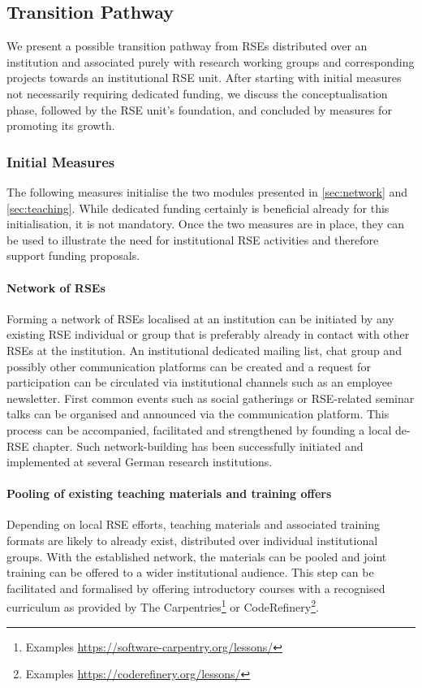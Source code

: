 \documentclass[a4paper]{article}
\begin{document}
\subsection{Transition Pathway}

We present a possible transition pathway from RSEs distributed over an institution and associated purely with research working groups and corresponding projects towards an institutional RSE unit.
After starting with initial measures not necessarily requiring dedicated funding, we discuss the conceptualisation phase, followed by the RSE unit's foundation, and concluded by measures for promoting its growth.

\subsubsection{Initial Measures}
The following measures initialise the two modules presented in \autoref{sec:network} and \autoref{sec:teaching}.
While dedicated funding certainly is beneficial already for this initialisation, it is not mandatory.
Once the two measures are in place, they can be used to illustrate the need for institutional RSE activities and therefore support funding proposals.

\paragraph{Network of RSEs}
Forming a network of RSEs localised at an institution can be initiated by any existing RSE individual or group that is preferably already in contact with other RSEs at the institution.
An institutional dedicated mailing list, chat group and possibly other communication platforms can be created and a request for participation can be circulated via institutional channels such as an employee newsletter.
First common events such as social gatherings or RSE-related seminar talks can be organised and announced via the communication platform.
This process can be accompanied, facilitated and strengthened by founding a local de-RSE chapter.
Such network-building has been successfully initiated and implemented at several German research institutions.

\paragraph{Pooling of existing teaching materials and training offers}
Depending on local RSE efforts, teaching materials and associated training formats are likely to already exist,
distributed over individual institutional groups.
With the established network, the materials can be pooled and joint training can be offered to a wider institutional audience.
This step can be facilitated and formalised by offering introductory courses with a recognised curriculum as provided by The Carpentries\footnote{Examples \url{https://software-carpentry.org/lessons/}}
or CodeRefinery\footnote{Examples \url{https://coderefinery.org/lessons/}}.
\end{document}

